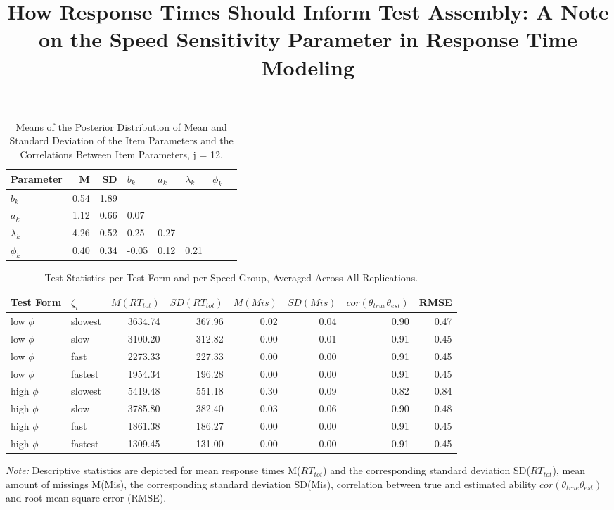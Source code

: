 \documentclass[a4paper,man,floatsintext,donotrepeattitle]{apa6}
\title{How Response Times Should Inform Test Assembly: A Note on the Speed Sensitivity Parameter in Response Time Modeling
\vspace{3cm}}
\begin{document}

\clearpage
\setcounter{page}{23}

\begin{table}[ht]
\centering
\caption{Means of the Posterior Distribution of Mean and Standard Deviation of the Item Parameters and the Correlations Between Item Parameters, j = 12.} 
\begin{tabular}{lrrlllll}
  \hline
Parameter & M & SD & $b_{k}$ & $a_{k}$ & $\lambda_{k}$ & $\phi_{k}$  \\ 
  \hline
$b_{k}$ & 0.54 & 1.89 &  &  &  &  \\ 
  $a_{k}$ & 1.12 & 0.66 & 0.07 &  &  &   \\ 
  $\lambda_{k}$ & 4.26 & 0.52 & 0.25 & 0.27 &  &   \\ 
  $\phi_{k}$ & 0.40 & 0.34 & -0.05 & 0.12 & 0.21 &   \\ 
   \hline
\end{tabular}
\label{tab:postMeans}
\end{table}
 
\vspace{4cm} 
 
\begin{table}[!htb]
\centering
\caption{Test Statistics per Test Form and per Speed Group, Averaged Across All Replications.} 
\begin{tabular}{llrrrrrr}
  \hline
Test Form & $\zeta_{i}$ & $M(RT_{tot})$ & $SD(RT_{tot})$ & $M(Mis)$ & $SD(Mis)$ & $cor(\theta_{true} \theta_{est})$ & RMSE \\ 
  \hline
low $\phi$ & slowest & 3634.74 & 367.96 & 0.02 & 0.04 & 0.90 & 0.47 \\ 
  low $\phi$ & slow & 3100.20 & 312.82 & 0.00 & 0.01 & 0.91 & 0.45 \\ 
  low $\phi$ & fast & 2273.33 & 227.33 & 0.00 & 0.00 & 0.91 & 0.45 \\ 
  low $\phi$ & fastest & 1954.34 & 196.28 & 0.00 & 0.00 & 0.91 & 0.45 \\ 
  high $\phi$ & slowest & 5419.48 & 551.18 & 0.30 & 0.09 & 0.82 & 0.84 \\ 
  high $\phi$ & slow & 3785.80 & 382.40 & 0.03 & 0.06 & 0.90 & 0.48 \\ 
  high $\phi$ & fast & 1861.38 & 186.27 & 0.00 & 0.00 & 0.91 & 0.45 \\ 
  high $\phi$ & fastest & 1309.45 & 131.00 & 0.00 & 0.00 & 0.91 & 0.45 \\ 
   \hline
\end{tabular}
\begin{tablenotes}
\vspace{0.1cm}
\small
    \textit{Note:} Descriptive statistics are depicted for mean response times M($RT_{tot}$) and the corresponding standard deviation SD($RT_{tot}$), mean amount of missings M(Mis), the corresponding standard deviation SD(Mis), correlation between true and estimated ability $cor(\theta_{true} \theta_{est})$ and root mean square error (RMSE). 
\end{tablenotes}
\label{tab:descr}
\end{table}
\end{document}
